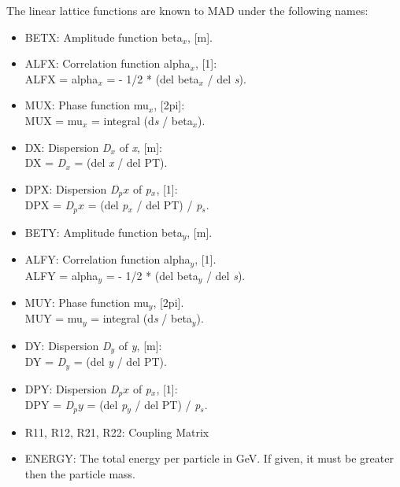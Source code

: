 The linear lattice functions are known to MAD under the following names:
\begin{itemize}
	\item BETX: Amplitude function beta$_\textit{x}$, [m].   
	\item ALFX: Correlation function alpha$_\textit{x}$, [1]:\\     
          ALFX = alpha$_\textit{x}$ = - 1/2 * (del beta$_\textit{x}$ / del \textit{s}).     
	\item MUX: Phase function mu$_\textit{x}$, [2pi]:\\
          MUX = mu$_\textit{x}$ = integral (d\textit{s} / beta$_\textit{x}$).     
	\item DX: Dispersion \textit{D$_x$} of \textit{x}, [m]:\\
          DX = \textit{D$_x$} = (del \textit{x} / del PT).     
	\item DPX: Dispersion \textit{D$_px$} of \textit{p$_x$}, [1]:\\
          DPX = \textit{D$_px$} = (del \textit{p$_x$} / del PT) / \textit{p$_s$}.     
	\item BETY: Amplitude function beta$_\textit{y}$, [m].   
	\item ALFY: Correlation function alpha$_\textit{y}$, [1].\\
          ALFY = alpha$_\textit{y}$ = - 1/2 * (del beta$_\textit{y}$ / del \textit{s}).     
	\item MUY: Phase function mu$_\textit{y}$, [2pi].\\
          MUY = mu$_\textit{y}$ = integral (d\textit{s} / beta$_\textit{y}$).     
	\item DY: Dispersion \textit{D$_y$} of \textit{y}, [m]:\\
          DY = \textit{D$_y$} = (del \textit{y} / del PT).     
	\item DPY: Dispersion \textit{D$_px$} of \textit{p$_x$}, [1]:\\
          DPY = \textit{D$_py$} = (del \textit{p$_y$} / del PT) / \textit{p$_s$}.     
	\item R11, R12, R21, R22: Coupling Matrix     
	\item ENERGY: The total energy per particle in GeV. If given, it
          must be greater then the particle mass.
\end{itemize}



